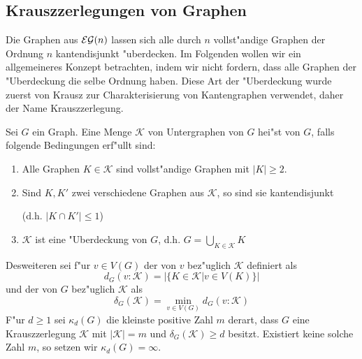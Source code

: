 \subsection{Krauszzerlegungen von Graphen}
Die Graphen aus ${\cal EG}(n)$ lassen sich alle durch $n$ vollst"andige Graphen der Ordnung $n$ kantendisjunkt "uberdecken. Im Folgenden wollen wir ein allgemeineres Konzept betrachten, indem wir nicht fordern, dass alle Graphen der "Uberdeckung die selbe Ordnung haben. 
Diese Art der "Uberdeckung wurde zuerst von Krausz zur Charakterisierung von Kantengraphen verwendet, daher der Name Krauszzerlegung.
\label{ssec:Krauszzerlegung}
\begin{definition}
  \label{def:Krauszzerlegung}
  Sei $G$ ein Graph. Eine Menge $\mathcal K$ von Untergraphen von $G$ hei"st  von $G$, falls folgende Bedingungen erf"ullt sind:
  \begin{enumerate}[label={\rm(K\alph*)}]
    \item Alle Graphen $K\in \mathcal{K}$ sind vollst"andige Graphen mit $|K| \geq 2$.
    \item Sind $K,K'$ zwei verschiedene Graphen aus $\mathcal{K}$, so sind sie kantendisjunkt 

      (d.h. $|K\cap K'| \leq 1$)
    \item $\mathcal K$ ist eine "Uberdeckung von $G$, d.h.  $G=\bigcup\limits_{K\in \mathcal K}K$
  \end{enumerate}
  Desweiteren sei f"ur $v\in V(G)$ der  von $v$ bez"uglich $\mathcal K$ definiert als $$d_G(v:\mathcal K) = |\{ K\in\mathcal K| v \in V(K)\}|$$ und der  von $G$ bez"uglich $\mathcal K$ als $$\delta_G(\mathcal K) = \min\limits_{v\in V(G)}d_G(v:\mathcal K)$$ 
  F"ur $d \geq 1$ sei $\kappa_d(G)$ die kleinste positive Zahl $m$ derart, dass $G$ eine Krauszzerlegung $\mathcal K$ mit $|\mathcal K| = m$ und $\delta_G(\mathcal K) \geq d$ besitzt. Existiert keine solche Zahl $m$, so setzen wir $\kappa_{d}(G) = \infty$.
\end{definition}

